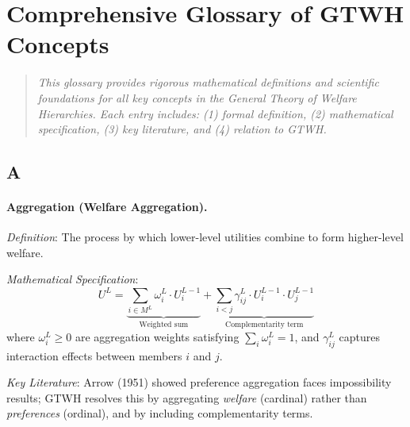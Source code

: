 \documentclass[12pt,a4paper]{article}
\begin{document}

\newpage
\section{Comprehensive Glossary of GTWH Concepts}
\label{app:glossary}

\begin{quote}
\textit{This glossary provides rigorous mathematical definitions and scientific 
foundations for all key concepts in the General Theory of Welfare Hierarchies. 
Each entry includes: (1) formal definition, (2) mathematical specification, 
(3) key literature, and (4) relation to GTWH.}
\end{quote}

\subsection*{A}

\paragraph{Aggregation (Welfare Aggregation).}
\textit{Definition}: The process by which lower-level utilities combine to form 
higher-level welfare.

\textit{Mathematical Specification}:
\begin{equation}
U^L = \underbrace{\sum_{i \in M^L} \omega^L_i \cdot U^{L-1}_i}_{\text{Weighted sum}} + 
\underbrace{\sum_{i < j} \gamma^L_{ij} \cdot U^{L-1}_i \cdot U^{L-1}_j}_{\text{Complementarity term}}
\end{equation}
where $\omega^L_i \geq 0$ are aggregation weights satisfying $\sum_i \omega^L_i = 1$, 
and $\gamma^L_{ij}$ captures interaction effects between members $i$ and $j$.

\textit{Key Literature}: Arrow (1951) showed preference aggregation faces impossibility 
results; GTWH resolves this by aggregating \textit{welfare} (cardinal) rather than 
\textit{preferences} (ordinal), and by including complementarity terms.
\end{document}
